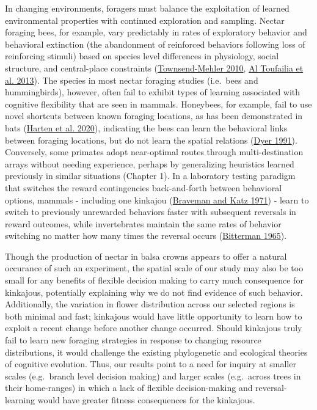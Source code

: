 \documentclass[twoside,12pt,final]{ucthesis-CA2012}
\begin{document}
\begin{ucmainmatter}
In changing environments, foragers must balance the exploitation of learned environmental properties with continued exploration and sampling. Nectar foraging bees, for example, vary predictably in rates of exploratory behavior and behavioral extinction (the abandonment of reinforced behaviors following loss of reinforcing stimuli) based on species level differences in physiology, social structure, and central-place constraints (\protect\hyperlink{ref-townsend-mehler2010}{Townsend-Mehler 2010}, \protect\hyperlink{ref-altoufailia2013}{Al Toufailia et al. 2013}). The species in most nectar foraging studies (i.e.~bees and hummingbirds), however, often fail to exhibit types of learning associated with cognitive flexibility that are seen in mammals. Honeybees, for example, fail to use novel shortcuts between known foraging locations, as has been demonstrated in bats (\protect\hyperlink{ref-harten2020}{Harten et al. 2020}), indicating the bees can learn the behavioral links between foraging locations, but do not learn the spatial relations (\protect\hyperlink{ref-dyer1991}{Dyer 1991}). Conversely, some primates adopt near-optimal routes through multi-destination arrays without needing experience, perhaps by generalizing heuristics learned previously in similar situations (Chapter 1). In a laboratory testing paradigm that switches the reward contingencies back-and-forth between behavioral options, mammals - including one kinkajou (\protect\hyperlink{ref-braveman1971a}{Braveman and Katz 1971}) - learn to switch to previously unrewarded behaviors faster with subsequent reversals in reward outcomes, while invertebrates maintain the same rates of behavior switching no matter how many times the reversal occurs (\protect\hyperlink{ref-bitterman1965}{Bitterman 1965}).

Though the production of nectar in balsa crowns appears to offer a natural occurance of such an experiment, the spatial scale of our study may also be too small for any benefits of flexible decision making to carry much consequence for kinkajous, potentially explaining why we do not find evidence of such behavior. Additionally, the variation in flower distribution across our selected regions is both minimal and fast; kinkajous would have little opportunity to learn how to exploit a recent change before another change occurred. Should kinkajous truly fail to learn new foraging strategies in response to changing resource distributions, it would challenge the existing phylogenetic and ecological theories of cognitive evolution. Thus, our results point to a need for inquiry at smaller scales (e.g.~branch level decision making) and larger scales (e.g.~across trees in their home-ranges) in which a lack of flexible decision-making and reversal-learning would have greater fitness consequences for the kinkajous.


\end{ucmainmatter}
\end{document}
